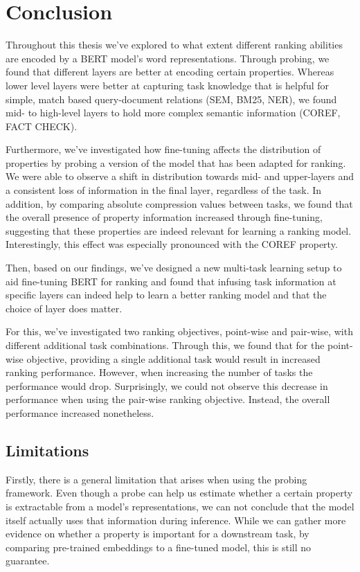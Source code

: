 \chapter{Conclusion}
\label{chap:conclusion}
Throughout this thesis we've explored to what extent different ranking abilities are encoded by a BERT model's word representations. Through probing, we found that different layers are better at encoding certain properties. Whereas lower level layers were better at capturing task knowledge that is helpful for simple, match based query-document relations (SEM, BM25, NER), we found mid- to high-level layers to hold more complex semantic information (COREF, FACT CHECK).

Furthermore, we've investigated how fine-tuning affects the distribution of properties by probing a version of the model that has been adapted for ranking. We were able to observe a shift in distribution towards mid- and upper-layers and a consistent loss of information in the final layer, regardless of the task. In addition, by comparing absolute compression values between tasks, we found that the overall presence of property information increased through fine-tuning, suggesting that these properties are indeed relevant for learning a ranking model. Interestingly, this effect was especially pronounced with the COREF property.

Then, based on our findings, we've designed a new multi-task learning setup to aid fine-tuning BERT for ranking and found that infusing task information at specific layers can indeed help to learn a better ranking model and that the choice of layer does matter.

For this, we've investigated two ranking objectives, point-wise and pair-wise, with different additional task combinations. Through this, we found that for the point-wise objective, providing a single additional task would result in increased ranking performance. However, when increasing the number of tasks the performance would drop. Surprisingly, we could not observe this decrease in performance when using the pair-wise ranking objective. Instead, the overall performance increased nonetheless.

\section{Limitations}
\label{sec:limitations}
Firstly, there is a general limitation that arises when using the probing framework. Even though a probe can help us estimate whether a certain property is extractable from a model's representations, we can not conclude that the model itself actually uses that information during inference. While we can gather more evidence on whether a property is important for a downstream task, by comparing pre-trained embeddings to a fine-tuned model, this is still no guarantee.

